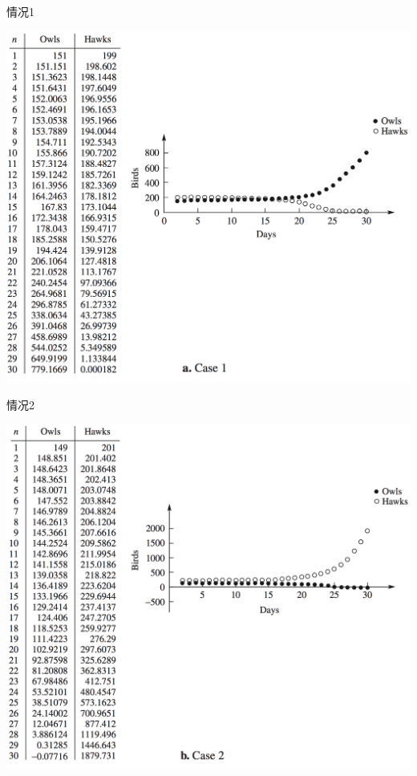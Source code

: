 \documentclass[UTF8]{ctexbeamer}
\begin{document}
\begin{frame}{情况1}
  \begin{center}
    \includegraphics[height=.9\textheight{}]{owl-1.png}
  \end{center}  
\end{frame}

\begin{frame}{情况2}
  \begin{center}
    \includegraphics[height=.9\textheight{}]{owl-2.png}
  \end{center}  
\end{frame}
\end{document}
